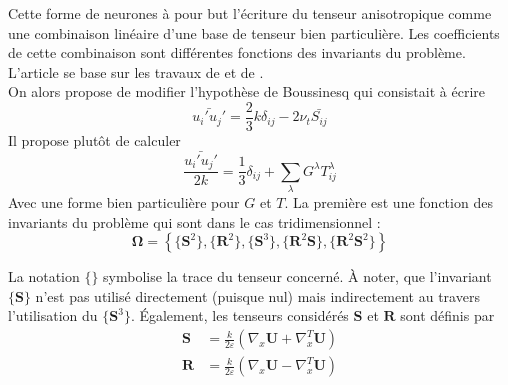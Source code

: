 \documentclass[a4paper,12pt]{report}
\numberwithin{equation}{section} %
\begin{document}
\noindent Cette forme de neurones à pour but l'écriture du tenseur anisotropique comme une combinaison linéaire d'une base de tenseur bien particulière.  Les coefficients de cette combinaison sont différentes fonctions des invariants du problème. L'article se base sur les travaux de \cite{pope1975more} et de \cite{smith1965isotropic}.\\
On alors propose de modifier l'hypothèse de Boussinesq qui consistait à écrire 
\begin{equation*}
\bar{u_i' u_j'} = \frac{2}{3} k \delta_{ij} - 2 \nu_t \bar{S_{ij}}
\end{equation*}
 Il propose plutôt de calculer 
\begin{equation*}
\frac{\bar{u_i' u_j'} }{2k}= \frac{1}{3} \delta_{ij} + \sum_\lambda G^\lambda T^\lambda_{ij} 
\end{equation*}
Avec une forme bien particulière pour $G$ et $T$. La première est une fonction des invariants du problème qui sont dans le cas tridimensionnel : 
\begin{equation*}
\mathbf{\Omega}= \left \{ \{\textbf{S}^2\}, \{\textbf{R}^2\}, \{\textbf{S}^3\}, \{\textbf{R}^2\textbf{S}\}, \{\textbf{R}^2 \textbf{S}^2\}\right \} 
\end{equation*}

\noindent La notation $\textbf{\{\}}$ symbolise la trace du tenseur concerné. À noter, que l'invariant $\{\textbf{S}\}$ n'est pas utilisé directement (puisque nul) mais indirectement au travers l'utilisation du $\{\textbf{S}^3\}$. Également, les tenseurs considérés $\textbf{S}$ et $\textbf{R}$ sont définis par 
\begin{align*}
\textbf{S} &= \frac{k}{2\varepsilon}\left(\nabla_x\textbf{U} + \nabla^T_x\textbf{U} \right) \\[0.2cm]
\textbf{R} &= \frac{k}{2 \varepsilon}\left(\nabla_x\textbf{U} - \nabla^T_x\textbf{U} \right) 
\end{align*}

\pagebreak 
\end{document}
